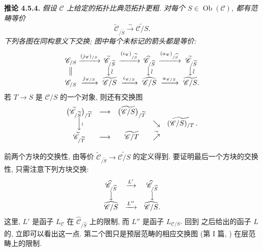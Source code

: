 
\medskip
\noindent{}\textbf{推论 4.5.4.}
\textit{假设 \(\mathscr C\) 上给定的拓扑比典范拓扑更粗.
对每个 \(S\in\operatorname{Ob}(\mathscr C)\), 都有范畴等价}
\[
  \widetilde{\mathscr C}_{/\widetilde S}
  \xrightarrow{\ \sim\ }
  \widetilde{\mathscr C/S}.
\]
\textit{下列各图在同构意义下交换;
图中每个未标记的箭头都是等价:}
\[
\begin{array}{c@{\;}c@{\;}c@{\;}c@{\;}c@{\;}c@{\;}c}
\mathscr C_{/S}
 &\xrightarrow{(j_{\mathscr C})_{/S}}&
 \widetilde{\mathscr C}_{/\widetilde S}
 &\xrightarrow{(i_{\mathscr C})_{/\widetilde S}}&
 \widehat{\mathscr C}_{/\widehat S}
 &\xrightarrow{(a_{\mathscr C})_{/\widehat S}}&
 \widetilde{\mathscr C}_{/\widetilde S}
 \\
 \big\Vert && \big\downarrow\wr && \big\downarrow\wr && \big\downarrow\wr
 \\
\mathscr C_{/S}
 &\xrightarrow{j_{\mathscr C/S}}&
 \widetilde{\mathscr C/S}
 &\xrightarrow{i_{\mathscr C/S}}&
 \widehat{\mathscr C/S}
 &\xrightarrow{a_{\mathscr C/S}}&
 \widetilde{\mathscr C/S}.
\end{array}
\]
若 \(T\to S\) 是 \(\mathscr C/S\) 的一个对象, 则还有交换图
\[
\begin{array}{ccccc}
 \bigl(\widetilde{\mathscr C}_{/\widetilde S}\bigr)_{/\widetilde T}
 &\longrightarrow&
 \bigl(\widetilde{\mathscr C/S}\bigr)_{/\widetilde T}
 &&\\[-0.15em]
 \Big\downarrow\rlap{\(\scriptstyle\wr\)}
 &&& \searrow &
 \widetilde{(\mathscr C/S)_{/T}}\, .
 \\
 \widetilde{\mathscr C}_{/\widetilde T}
 &\longrightarrow&
 \widetilde{\mathscr C/T}
 &\mathrel{\overset{\sim}{\nearrow}}&
\end{array}
\]

前两个方块的交换性, 由等价
\(
  \widetilde{\mathscr C}_{/\widetilde S}
  \to\widetilde{\mathscr C/S}
\)
的定义得到.
要证明最后一个方块的交换性, 只需注意下列方块交换:
\[
\begin{array}{ccc}
 \widehat{\mathscr C}_{/\widehat S}
 &\xrightarrow{L'}&
 \widehat{\mathscr C}_{/\widehat S}
 \\
 \big\downarrow && \big\downarrow
 \\
 \widehat{\mathscr C/S}
 &\xrightarrow{L''}&
 \widehat{\mathscr C/S}.
\end{array}
\]
这里, \(L'\) 是函子 \(L_{\mathscr C}\) 在
\(\widehat{\mathscr C}_{/\widehat S}\) 上的限制,
而 \(L''\) 是函子 \(L_{\mathscr C/S}\).
回到  之后给出的函子 \(L\)
的, 立即可以看出这一点.
第二个图只是预层范畴的相应交换图 (第 I 篇,
) 在层范畴上的限制.

